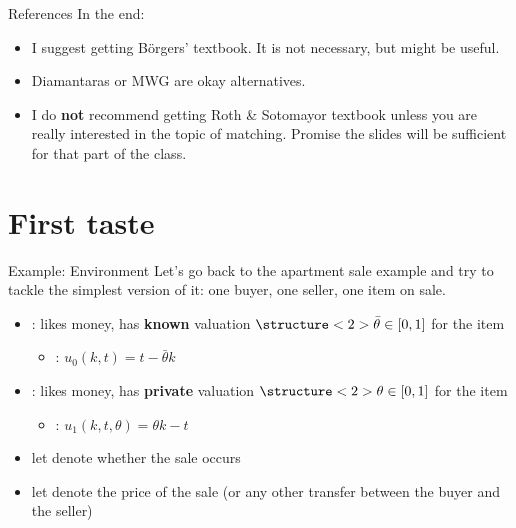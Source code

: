 \documentclass[english,10pt
,aspectratio=169
]{beamer}
\begin{document}
\begin{frame}{References}
	In the end:
	\begin{itemize}
		\item I suggest getting B{\"o}rgers' textbook. It is not necessary, but might be useful.
		\item Diamantaras or MWG are okay alternatives.
		\item I do \textbf{not} recommend getting Roth \& Sotomayor textbook unless you are really interested in the topic of matching. Promise the slides will be sufficient for that part of the class.
	\end{itemize}
\end{frame}


\section{First taste}

\begin{frame}{Example: Environment}
	Let's go back to the apartment sale example and try to tackle the simplest version of it: one buyer, one seller, one item on sale.
	\pause
	
	\begin{itemize}
		\item {}: likes money, has \textbf{known} valuation $\structure<2>{\bar{\theta}} \in [0,1]$ for the item
		\begin{itemize}[<4>]
			\item {}: $u_0(k,t) = t - \bar{\theta} k$
		\end{itemize}
		\item {}: likes money, has \textbf{private} valuation $\structure<2>{\theta} \in [0,1]$ for the item
		\begin{itemize}[<4>]
			\item {}: $u_1(k,t,\theta) = \theta k - t$
		\end{itemize}
		\pause
		\item let  denote whether the sale occurs
		\item let  denote the price of the sale (or any other transfer between the buyer and the seller)
	\end{itemize}
\end{frame}
\end{document}
